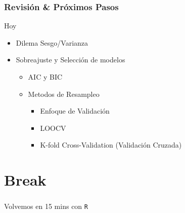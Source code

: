 \documentclass[
  shownotes,
  xcolor={svgnames},
  hyperref={colorlinks,citecolor=DarkBlue,linkcolor=DarkRed,urlcolor=DarkBlue}
  , aspectratio=169]{beamer}
\begin{document}
\begin{frame}
\frametitle{Revisión \& Próximos Pasos}
  
Hoy
    \medskip
    \begin{itemize} 
        \item Dilema Sesgo/Varianza
         \medskip
         \item Sobreajuste y Selección de modelos
         \medskip
         \begin{itemize}  
         \item AIC y BIC
         \medskip
         \item Metodos de Resampleo
        \begin{itemize}  
            \item Enfoque de Validación
            \medskip
            \item LOOCV
            \medskip
            \item K-fold Cross-Validation (Validación Cruzada)
      \end{itemize}
      \end{itemize}
    




\end{itemize}



\end{frame}
\section{Break}
\begin{frame}
\frametitle{}

\begin{centering}
\huge
\textcolor{andesred}{Volvemos en 15 mins con \texttt{R} }

\end{centering}

\end{frame}
\end{document}
